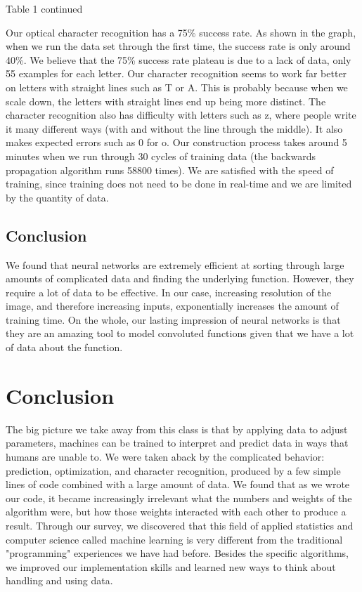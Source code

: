\documentclass[11pt,a4paper]{article}
\begin{document}
\begin{table}
\caption{Table 1 continued}
\vspace{-40px}
\end{table}

Our optical character recognition has a 75\% success rate. As shown in the graph, when we run the data set through the first time, the success rate is only around 40\%. We believe that the 75\% success rate plateau is due to a lack of data, only 55 examples for each letter. Our character recognition seems to work far better on letters with straight lines such as T or A. This is probably because when we scale down, the letters with straight lines end up being more distinct. The character recognition also has difficulty with letters such as z, where people write it many different ways (with and without the line through the middle). It also makes expected errors such as 0 for o. Our construction process takes around 5 minutes when we run through 30 cycles of training data (the backwards propagation algorithm runs 58800 times). We are satisfied with the speed of training, since training does not need to be done in real-time and we are limited by the quantity of data.

\subsection{Conclusion}
\label{Artificial Neural Nets:Conclusion}

We found that neural networks are extremely efficient at sorting through large amounts of complicated data and finding the underlying function. However, they require a lot of data to be effective. In our case, increasing resolution of the image, and therefore increasing inputs, exponentially increases the amount of training time. On the whole, our lasting impression of neural networks is that they are an amazing tool to model convoluted functions given that we have a lot of data about the function.

\section*{Conclusion}
\label{Conclusion}

The big picture we take away from this class is that by applying data to adjust parameters, machines can be trained to interpret and predict data in ways that humans are unable to. We were taken aback by the complicated behavior: prediction, optimization, and character recognition, produced by a few simple lines of code combined with a large amount of data. We found that as we wrote our code, it became increasingly irrelevant what the numbers and weights of the algorithm were, but how those weights interacted with each other to produce a result. Through our survey, we discovered that this field of applied statistics and computer science called machine learning is very different from the traditional "programming" experiences we have had before. Besides the specific algorithms, we improved our implementation skills and learned new ways to think about handling and using data.
\end{document}
